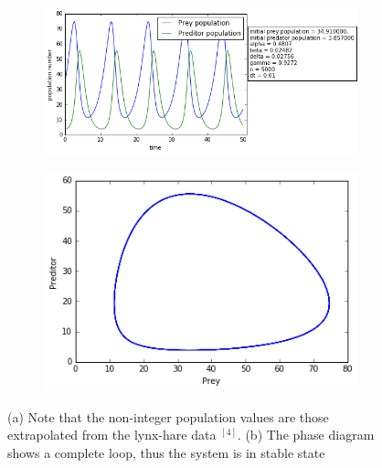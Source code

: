 \documentclass[11pt]{elsarticle}
\begin{document}
\begin{figure}
\centering
   \begin{subfigure}[b]{1\textwidth}
   \includegraphics[width=0.9\linewidth]{figure1_time.png}
   \caption{}
   \label{fig:Ng1} 
\end{subfigure}

\begin{subfigure}[b]{1\textwidth}
   \includegraphics[width=0.6\linewidth]{figure1_phase.png}
   \caption{}
   \label{fig:Ng2}
\end{subfigure}

\caption{(a) Note that the non-integer population values are those extrapolated from the lynx-hare data $^{[4]}$. (b) The phase diagram shows a complete loop, thus the system is in stable state}
\end{figure}
\noindent
\newline
\end{document}

